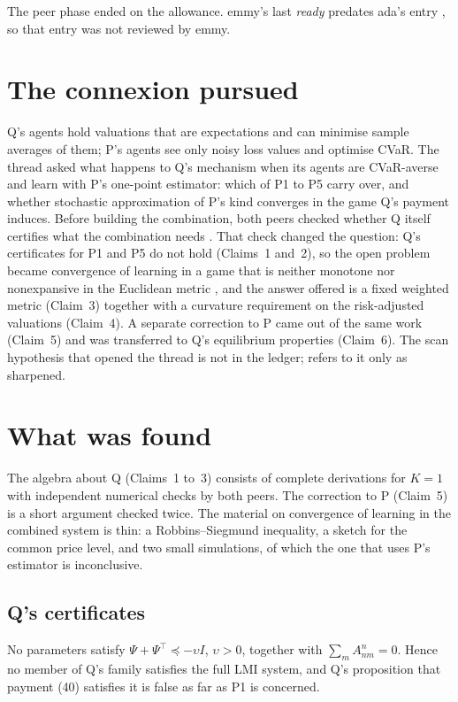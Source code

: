 \documentclass{article}
\begin{document}
The peer phase ended on the allowance. emmy's last \emph{ready}  predates ada's entry , so that entry was not reviewed by emmy.

\section{The connexion pursued}

Q's agents hold valuations that are expectations and can minimise sample averages of them; P's agents see only noisy loss values and optimise CVaR. The thread asked what happens to Q's mechanism when its agents are CVaR-averse and learn with P's one-point estimator: which of P1 to P5 carry over, and whether stochastic approximation of P's kind converges in the game Q's payment induces. Before building the combination, both peers checked whether Q itself certifies what the combination needs . That check changed the question: Q's certificates for P1 and P5 do not hold (Claims~1 and~2), so the open problem became convergence of learning in a game that is neither monotone nor nonexpansive in the Euclidean metric , and the answer offered is a fixed weighted metric (Claim~3) together with a curvature requirement on the risk-adjusted valuations (Claim~4). A separate correction to P came out of the same work (Claim~5) and was transferred to Q's equilibrium properties (Claim~6). The scan hypothesis that opened the thread is not in the ledger;  refers to it only as sharpened.

\section{What was found}

The algebra about Q (Claims~1 to~3) consists of complete derivations for \(K=1\) with independent numerical checks by both peers. The correction to P (Claim~5) is a short argument checked twice. The material on convergence of learning in the combined system is thin: a Robbins--Siegmund inequality, a sketch for the common price level, and two small simulations, of which the one that uses P's estimator is inconclusive.

\subsection{Q's certificates}

\begin{claim}[P1 (ii) contradicts P2 (i)]
No parameters satisfy \(\Psi+\Psi^\top\preceq-\upsilon I\), \(\upsilon>0\), together with \(\sum_mA^n_{nm}=0\). Hence no member of Q's family satisfies the full LMI system, and Q's proposition that payment (40) satisfies it is false as far as P1 is concerned. 
\end{claim}
\end{document}
